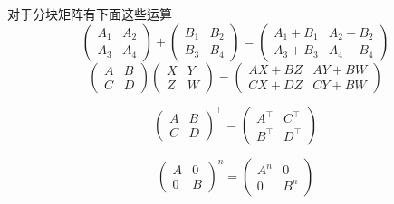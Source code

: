 对于分块矩阵有下面这些运算
\begin{equation}
    \begin{pmatrix}
        A_1 & A_2 \\
        A_3 & A_4
    \end{pmatrix}
    +
    \begin{pmatrix}
        B_1 & B_2 \\
        B_3 & B_4
    \end{pmatrix}
    =
    \begin{pmatrix}
        A_1+B_1 & A_2+B_2 \\
        A_3+B_3 & A_4+B_4
    \end{pmatrix}
\end{equation}
\begin{equation}
    \begin{pmatrix}
        A & B \\
        C & D
    \end{pmatrix}
    \begin{pmatrix}
        X & Y \\
        Z & W
    \end{pmatrix}
    =
    \begin{pmatrix}
        AX+BZ & AY+BW \\
        CX+DZ & CY+BW
    \end{pmatrix}
\end{equation}

\begin{equation}
    \begin{pmatrix}
        A & B \\
        C & D
    \end{pmatrix}^\intercal
    =
    \begin{pmatrix}
        A^\intercal & C^\intercal \\
        B^\intercal & D^\intercal
    \end{pmatrix}
\end{equation}

\begin{equation}
    \begin{pmatrix}
        A & 0 \\
        0 & B
    \end{pmatrix}^n
    =
    \begin{pmatrix}
        A^n & 0   \\
        0   & B^n
    \end{pmatrix}
\end{equation}

